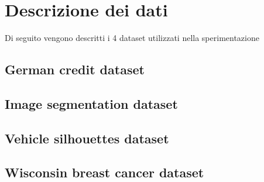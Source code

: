 \chapter{Descrizione dei dati}
\label{ch:data}

Di seguito vengono descritti i 4 dataset utilizzati nella sperimentazione

\section{German credit dataset}

\section{Image segmentation dataset}

\section{Vehicle silhouettes dataset}

\section{Wisconsin breast cancer dataset}